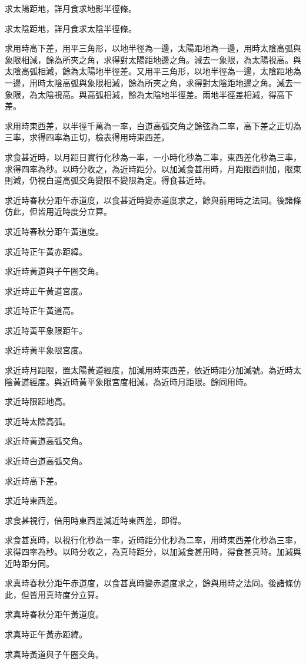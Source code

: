 \begin{pinyinscope}
求太陽距地，詳月食求地影半徑條。

求太陰距地，詳月食求太陰半徑條。

求用時高下差，用平三角形，以地半徑為一邊，太陽距地為一邊，用時太陰高弧與象限相減，餘為所夾之角，求得對太陽距地邊之角。減去一象限，為太陽視高。與太陰高弧相減，餘為太陽地半徑差。又用平三角形，以地半徑為一邊，太陰距地為一邊，用時太陰高弧與象限相減，餘為所夾之角，求得對太陰距地邊之角。減去一象限，為太陰視高。與高弧相減，餘為太陰地半徑差。兩地半徑差相減，得高下差。

求用時東西差，以半徑千萬為一率，白道高弧交角之餘弦為二率，高下差之正切為三率，求得四率為正切，檢表得用時東西差。

求食甚近時，以月距日實行化秒為一率，一小時化秒為二率，東西差化秒為三率，求得四率為秒。以時分收之，為近時距分。以加減食甚用時，月距限西則加，限東則減，仍視白道高弧交角變限不變限為定。得食甚近時。

求近時春秋分距午赤道度，以食甚近時變赤道度求之，餘與前用時之法同。後諸條仿此，但皆用近時度分立算。

求近時春秋分距午黃道度。

求近時正午黃赤距緯。

求近時黃道與子午圈交角。

求近時正午黃道宮度。

求近時正午黃道高。

求近時黃平象限距午。

求近時黃平象限宮度。

求近時月距限，置太陽黃道經度，加減用時東西差，依近時距分加減號。為近時太陰黃道經度。與近時黃平象限宮度相減，為近時月距限。餘同用時。

求近時限距地高。

求近時太陰高弧。

求近時黃道高弧交角。

求近時白道高弧交角。

求近時高下差。

求近時東西差。

求食甚視行，倍用時東西差減近時東西差，即得。

求食甚真時，以視行化秒為一率，近時距分化秒為二率，用時東西差化秒為三率，求得四率為秒。以時分收之，為真時距分，以加減食甚用時，得食甚真時。加減與近時距分同。

求真時春秋分距午赤道度，以食甚真時變赤道度求之，餘與用時之法同。後諸條仿此，但皆用真時度分立算。

求真時春秋分距午黃道度。

求真時正午黃赤距緯。

求真時黃道與子午圈交角。


\end{pinyinscope}
